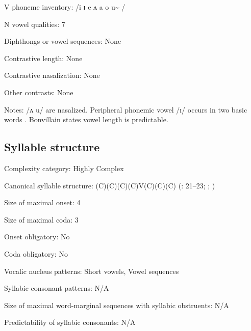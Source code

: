 {\begin{appendixdesc}
\item[V phoneme inventory:] /i ɪ e ʌ a o u\~{} /

\item[N vowel qualities:] 7

\item[Diphthongs or vowel sequences:] None

\item[Contrastive length:] None

\item[Contrastive nasalization:] None

\item[Other contrasts:] None

\item[Notes:] /ʌ u/ are nasalized. Peripheral phonemic vowel /ɪ/ occurs in two basic words \citep[43]{Bonvillain1973}. Bonvillain states vowel length is predictable.
\end{appendixdesc}
\subsection*{Syllable structure}
\begin{appendixdesc}

\item[Complexity category:] Highly Complex

\item[Canonical syllable structure:] (C)(C)(C)(C)V(C)(C)(C) (\citealt{Bonvillain1973}: 21--23; \citealt{Michelson1981}; \citeyear[12]{Michelson1988})

\item[Size of maximal onset:] 4

\item[Size of maximal coda:] 3

\item[Onset obligatory:] No

\item[Coda obligatory:] No

\item[Vocalic nucleus patterns:] Short vowels, Vowel sequences

\item[Syllabic consonant patterns:] N/A

\item[Size of maximal word-marginal sequences with syllabic obstruents:] N/A

\item[Predictability of syllabic consonants:] N/A


\end{appendixdesc}}
